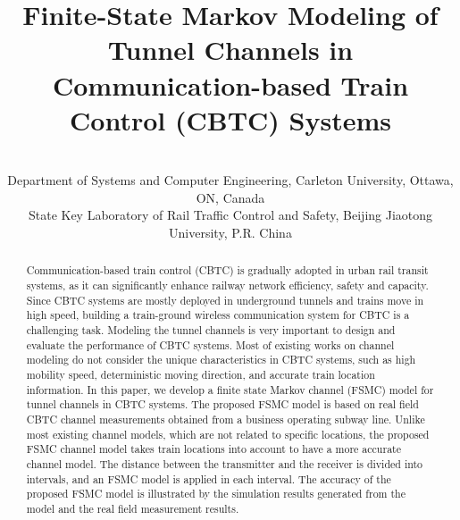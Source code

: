 \documentclass[conference]{IEEEtran}
\begin{document}
\title{Finite-State Markov Modeling of Tunnel Channels in Communication-based Train Control (CBTC) Systems}

\author{
\\
Department of Systems and Computer Engineering, Carleton University, Ottawa, ON, Canada\\
State Key Laboratory of Rail Traffic Control and Safety, Beijing Jiaotong University, P.R. China


}




\maketitle

\begin{abstract}
Communication-based train control (CBTC) is gradually adopted in urban rail transit systems, as it can significantly enhance railway network efficiency, safety and capacity. Since CBTC systems are mostly deployed in underground tunnels and trains move in high speed, building a train-ground wireless communication system for CBTC is a challenging task. Modeling the tunnel channels is very important to design and evaluate the performance of CBTC systems. Most of existing works on channel modeling do not consider the unique characteristics in CBTC systems, such as high mobility speed, deterministic moving direction, and accurate train location information. In this paper, we develop a finite state Markov channel (FSMC) model for tunnel channels in CBTC systems. The proposed FSMC model is based on real field CBTC channel measurements obtained from a business operating subway line. Unlike most existing channel models, which are not related to specific locations, the proposed FSMC channel model takes train locations into account to have a more accurate channel model. The distance between the transmitter and the receiver is  divided into intervals, and an FSMC model is applied in each interval. The accuracy of the proposed FSMC model is illustrated by the simulation results generated from the model and the real field measurement results.
\end{abstract}








\IEEEpeerreviewmaketitle
\end{document}

